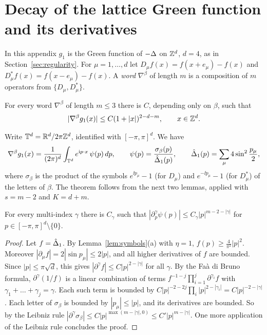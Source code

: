 \section{Decay of the lattice Green function and its derivatives}\label{app:green}

In this appendix $g_1$ is the Green function of $-\Delta$ on $\mathbb Z^d$, $d=4$, as in Section~\ref{sec:regularity}. For $\mu=1,\dots,d$ let $D_\mu f(x)=f(x+e_\mu)-f(x)$ and $D^*_\mu f(x)=f(x-e_\mu)-f(x)$. A \emph{word} $\nabla^\beta$ of length $m$ is a composition of $m$ operators from $\{D_\mu,D_\mu^*\}$.

\begin{theorem}\label{thm:green-unit}
For every word $\nabla^\beta$ of length $m\le3$ there is $C$, depending only on $\beta$, such that
\[
|\nabla^\beta g_1(x)|\le C(1+|x|)^{2-d-m},\qquad x\in\mathbb Z^d .
\]
\end{theorem}

Write $\mathbb T^d=\mathbb R^d/2\pi\mathbb Z^d$, identified with $[-\pi,\pi]^d$. We have
\[
\nabla^\beta g_1(x)=\frac1{(2\pi)^d}\int_{\mathbb T^d}e^{\mathrm i p\cdot x}\,\psi(p)\,dp,\qquad \psi(p)=\frac{\sigma_\beta(p)}{\hat{\Delta}_1(p)},\qquad\hat{\Delta}_1(p)=\sum_\mu4\sin^2\frac{p_\mu}2,
\]
where $\sigma_\beta$ is the product of the symbols $e^{\ii p_\mu}-1$ (for $D_\mu$) and $e^{-\ii p_\mu}-1$ (for $D_\mu^*$) of the letters of $\beta$. The theorem follows from the next two lemmas, applied with $s=m-2$ and $K=d+m$.

\begin{lemma}\label{lem:symbol-m}
For every multi-index $\gamma$ there is $C_\gamma$ such that $|\partial_p^\gamma \psi(p)|\le C_\gamma|p|^{m-2-|\gamma|}$ for $p\in[-\pi,\pi]^d\setminus\{0\}$.
\end{lemma}

\begin{proof}
Let $f=\hat{\Delta}_1$. By Lemma~\ref{lem:symbols}(a) with $\eta=1$, $f(p)\ge\frac4{\pi^2}|p|^2$. Moreover $|\partial_\mu f|=2|\sin p_\mu|\le2|p|$, and all higher derivatives of $f$ are bounded. Since $|p|\le\pi\sqrt d$, this gives $|\partial^\gamma f|\le C|p|^{2-|\gamma|}$ for all $\gamma$. By the Fa\`a di Bruno formula, $\partial^\gamma(1/f)$ is a linear combination of terms $f^{-1-j}\prod_{i=1}^j\partial^{\gamma_i}f$ with $\gamma_1+\dots+\gamma_j=\gamma$. Each such term is bounded by $C|p|^{-2-2j}\prod_i|p|^{2-|\gamma_i|}=C|p|^{-2-|\gamma|}$. Each letter of $\sigma_\beta$ is bounded by $|p_\mu|\le|p|$, and its derivatives are bounded. So by the Leibniz rule $|\partial^\gamma\sigma_\beta|\le C|p|^{\max(m-|\gamma|,0)}\le C'|p|^{m-|\gamma|}$. One more application of the Leibniz rule concludes the proof.
\end{proof}

